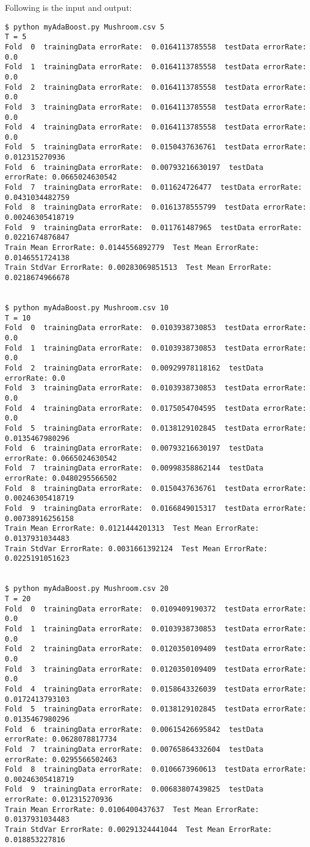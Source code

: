 \documentclass[12pt]{amsart}
\begin{document}
Following is the input and output:
\begin{verbatim}
$ python myAdaBoost.py Mushroom.csv 5
T = 5
Fold  0  trainingData errorRate:  0.0164113785558  testData errorRate: 0.0
Fold  1  trainingData errorRate:  0.0164113785558  testData errorRate: 0.0
Fold  2  trainingData errorRate:  0.0164113785558  testData errorRate: 0.0
Fold  3  trainingData errorRate:  0.0164113785558  testData errorRate: 0.0
Fold  4  trainingData errorRate:  0.0164113785558  testData errorRate: 0.0
Fold  5  trainingData errorRate:  0.0150437636761  testData errorRate: 0.012315270936
Fold  6  trainingData errorRate:  0.00793216630197  testData errorRate: 0.0665024630542
Fold  7  trainingData errorRate:  0.011624726477  testData errorRate: 0.0431034482759
Fold  8  trainingData errorRate:  0.0161378555799  testData errorRate: 0.00246305418719
Fold  9  trainingData errorRate:  0.011761487965  testData errorRate: 0.0221674876847
Train Mean ErrorRate: 0.0144556892779  Test Mean ErrorRate: 0.0146551724138
Train StdVar ErrorRate: 0.00283069851513  Test Mean ErrorRate: 0.0218674966678


$ python myAdaBoost.py Mushroom.csv 10
T = 10
Fold  0  trainingData errorRate:  0.0103938730853  testData errorRate: 0.0
Fold  1  trainingData errorRate:  0.0103938730853  testData errorRate: 0.0
Fold  2  trainingData errorRate:  0.00929978118162  testData errorRate: 0.0
Fold  3  trainingData errorRate:  0.0103938730853  testData errorRate: 0.0
Fold  4  trainingData errorRate:  0.0175054704595  testData errorRate: 0.0
Fold  5  trainingData errorRate:  0.0138129102845  testData errorRate: 0.0135467980296
Fold  6  trainingData errorRate:  0.00793216630197  testData errorRate: 0.0665024630542
Fold  7  trainingData errorRate:  0.00998358862144  testData errorRate: 0.0480295566502
Fold  8  trainingData errorRate:  0.0150437636761  testData errorRate: 0.00246305418719
Fold  9  trainingData errorRate:  0.0166849015317  testData errorRate: 0.00738916256158
Train Mean ErrorRate: 0.0121444201313  Test Mean ErrorRate: 0.0137931034483
Train StdVar ErrorRate: 0.0031661392124  Test Mean ErrorRate: 0.0225191051623


$ python myAdaBoost.py Mushroom.csv 20
T = 20
Fold  0  trainingData errorRate:  0.0109409190372  testData errorRate: 0.0
Fold  1  trainingData errorRate:  0.0103938730853  testData errorRate: 0.0
Fold  2  trainingData errorRate:  0.0120350109409  testData errorRate: 0.0
Fold  3  trainingData errorRate:  0.0120350109409  testData errorRate: 0.0
Fold  4  trainingData errorRate:  0.0158643326039  testData errorRate: 0.0172413793103
Fold  5  trainingData errorRate:  0.0138129102845  testData errorRate: 0.0135467980296
Fold  6  trainingData errorRate:  0.00615426695842  testData errorRate: 0.0628078817734
Fold  7  trainingData errorRate:  0.00765864332604  testData errorRate: 0.0295566502463
Fold  8  trainingData errorRate:  0.0106673960613  testData errorRate: 0.00246305418719
Fold  9  trainingData errorRate:  0.00683807439825  testData errorRate: 0.012315270936
Train Mean ErrorRate: 0.0106400437637  Test Mean ErrorRate: 0.0137931034483
Train StdVar ErrorRate: 0.00291324441044  Test Mean ErrorRate: 0.018853227816


\end{verbatim}
\end{document}
